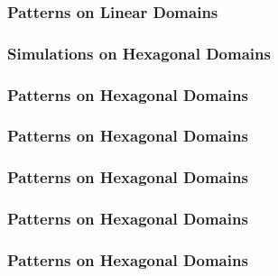 \documentclass[aspectratio=169]{beamer}
\begin{document}
\begin{frame}
  \frametitle{Patterns on Linear Domains}
\end{frame}

\begin{frame}
  \frametitle{Simulations on Hexagonal Domains}
\end{frame}

\begin{frame}
  \frametitle{Patterns on Hexagonal Domains}
\end{frame}

\begin{frame}
  \frametitle{Patterns on Hexagonal Domains}
\end{frame}

\begin{frame}
  \frametitle{Patterns on Hexagonal Domains}
\end{frame}

\begin{frame}
  \frametitle{Patterns on Hexagonal Domains}
\end{frame}

\begin{frame}
  \frametitle{Patterns on Hexagonal Domains}
\end{frame}
\end{document}
